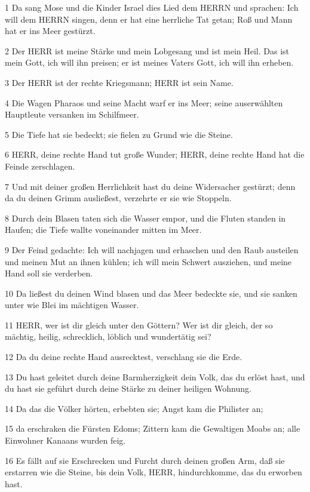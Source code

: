 \par 1 Da sang Mose und die Kinder Israel dies Lied dem HERRN und sprachen: Ich will dem HERRN singen, denn er hat eine herrliche Tat getan; Roß und Mann hat er ins Meer gestürzt.
\par 2 Der HERR ist meine Stärke und mein Lobgesang und ist mein Heil. Das ist mein Gott, ich will ihn preisen; er ist meines Vaters Gott, ich will ihn erheben.
\par 3 Der HERR ist der rechte Kriegsmann; HERR ist sein Name.
\par 4 Die Wagen Pharaos und seine Macht warf er ins Meer; seine auserwählten Hauptleute versanken im Schilfmeer.
\par 5 Die Tiefe hat sie bedeckt; sie fielen zu Grund wie die Steine.
\par 6 HERR, deine rechte Hand tut große Wunder; HERR, deine rechte Hand hat die Feinde zerschlagen.
\par 7 Und mit deiner großen Herrlichkeit hast du deine Widersacher gestürzt; denn da du deinen Grimm ausließest, verzehrte er sie wie Stoppeln.
\par 8 Durch dein Blasen taten sich die Wasser empor, und die Fluten standen in Haufen; die Tiefe wallte voneinander mitten im Meer.
\par 9 Der Feind gedachte: Ich will nachjagen und erhaschen und den Raub austeilen und meinen Mut an ihnen kühlen; ich will mein Schwert ausziehen, und meine Hand soll sie verderben.
\par 10 Da ließest du deinen Wind blasen und das Meer bedeckte sie, und sie sanken unter wie Blei im mächtigen Wasser.
\par 11 HERR, wer ist dir gleich unter den Göttern? Wer ist dir gleich, der so mächtig, heilig, schrecklich, löblich und wundertätig sei?
\par 12 Da du deine rechte Hand ausrecktest, verschlang sie die Erde.
\par 13 Du hast geleitet durch deine Barmherzigkeit dein Volk, das du erlöst hast, und du hast sie geführt durch deine Stärke zu deiner heiligen Wohnung.
\par 14 Da das die Völker hörten, erbebten sie; Angst kam die Philister an;
\par 15 da erschraken die Fürsten Edoms; Zittern kam die Gewaltigen Moabs an; alle Einwohner Kanaans wurden feig.
\par 16 Es fällt auf sie Erschrecken und Furcht durch deinen großen Arm, daß sie erstarren wie die Steine, bis dein Volk, HERR, hindurchkomme, das du erworben hast.
